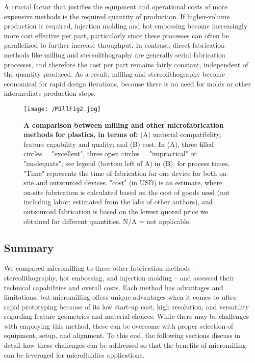 A crucial factor that justifies the equipment and operational costs of more expensive methods is the required quantity of production. If higher-volume production is required, injection molding and hot embossing become increasingly more cost effective per part, particularly since these processes can often be parallelized to further increase throughput. In contrast, direct fabrication methods like milling and stereolithography are generally serial fabrication processes, and therefore the cost per part remains fairly constant, independent of the quantity produced. As a result, milling and stereolithography become economical for rapid design iterations, because there is no need for molds or other intermediate production steps.

\begin{figure}[h!] %
\centering
\texttt{[image: /MillFig2.jpg]}
\caption[\textbf{A comparison between milling and other microfabrication methods for plastics}]{\textbf{A comparison between milling and other microfabrication methods for plastics, in terms of:} (A) material compatibility, feature capability and quality; and (B) cost. In (A), three filled circles = "excellent", three open circles = "impractical" or "inadequate"; see legend (bottom left of A) in (B), for process times, "Time" represents the time of fabrication for one device for both on-site and outsourced devices. "cost" (in USD) is an estimate, where on-site fabrication is calculated based on the cost of goods used (not including labor; estimated from the labs of other authors), and outsourced fabrication is based on the lowest quoted price we obtained for different quantities. N/A = not applicable.}
\label{figure:MillFig2}
\end{figure}

\subsection{Summary}
We compared micromilling to three other fabrication methods -- stereolithography, hot embossing, and injection molding -- and assessed their technical capabilities and overall costs. Each method has advantages and limitations, but micromilling offers unique advantages when it comes to ultra-rapid prototyping because of its low start-up cost, high resolution, and versatility regarding feature geometries and material choices. While there may be challenges with employing this method, these can be overcome with proper selection of equipment, setup, and alignment. To this end, the following sections discuss in detail how these challenges can be addressed so that the benefits of micromilling can be leveraged for microfluidics applications.


